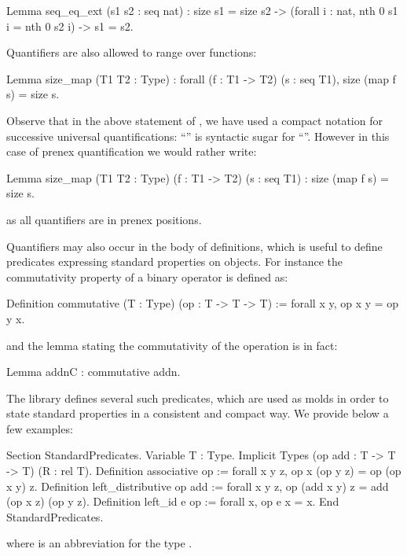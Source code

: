 \begin{coq}{}{}
Lemma seq_eq_ext (s1 s2 : seq nat) :
  size s1 = size s2 ->
  (forall i : nat, nth 0 s1 i = nth 0 s2 i) ->
  s1 = s2.
\end{coq}
Quantifiers are also allowed to range over functions:

\begin{coq}{}{}
Lemma size_map (T1 T2 : Type) :
forall (f : T1 -> T2) (s : seq T1), size (map f s) = size s.
\end{coq}
Observe that in the above statement of , we have used a
compact notation for successive universal quantifications:
``'' is syntactic sugar for
``''. However in this case
of prenex quantification we would rather write:

\begin{coq}{}{}
Lemma size_map (T1 T2 : Type) (f : T1 -> T2) (s : seq T1) :
 size (map f s) = size s.
\end{coq}
as all quantifiers are in prenex positions.

Quantifiers may also occur in the body of definitions, which is
useful to define predicates expressing standard properties on
objects. For instance the commutativity property of a binary operator
is defined as:

\begin{coq}{}{}
Definition commutative (T : Type) (op : T -> T -> T) :=
  forall x y, op x y = op y x.
\end{coq}
and the lemma stating the commutativity of the  operation is
in fact:

\begin{coq}{}{}
Lemma addnC : commutative addn.
\end{coq}
The \mcbMC{} library defines several such predicates, which are used
as molds in order to state standard properties in a consistent and
compact way. We provide below a few examples:

\begin{coq}{}{}
Section StandardPredicates.
Variable T : Type.
Implicit Types (op add : T -> T -> T) (R : rel T).
Definition associative op := forall x y z, op x (op y z) = op (op x y) z.
Definition left_distributive op add :=
  forall x y z, op (add x y) z = add (op x z) (op y z).
Definition left_id e op := forall x, op e x = x.
End StandardPredicates.
\end{coq}
where  is an abbreviation for the type .

